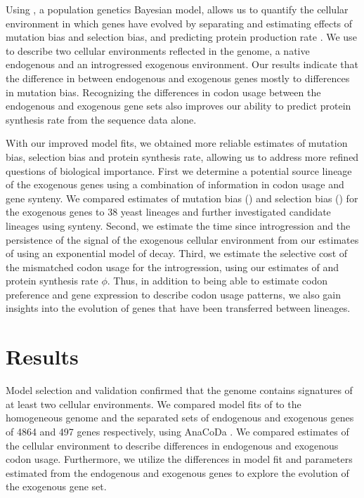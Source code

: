 Using \ROC, a population genetics Bayesian model, allows us to quantify the cellular environment in which genes have evolved by separating and estimating effects of mutation bias and selection bias, and predicting protein production rate \citep{gilchrist2015}.
We use \ROC to describe two cellular environments reflected in the \kluyveri genome, a native endogenous and an introgressed exogenous environment.
Our results indicate that the difference in \GC between endogenous and exogenous genes mostly to differences in mutation bias.
Recognizing the differences in codon usage between the endogenous and exogenous gene sets also improves our ability to predict protein synthesis rate from the sequence data alone.

With our improved model fits, we obtained more reliable estimates of mutation bias, selection bias and protein synthesis rate, allowing us to address more refined questions of biological importance.
First we determine a potential source lineage of the exogenous genes using a combination of information in codon usage and gene synteny.
We compared estimates of mutation bias (\DM) and selection bias (\DE) for the exogenous genes to 38 yeast lineages and further investigated candidate lineages using synteny.
Second, we estimate the time since introgression and the persistence of the signal of the exogenous cellular environment from our estimates of \DM using an exponential model of decay.
Third, we estimate the selective cost of the mismatched codon usage for the introgression, using our estimates of \DE and protein synthesis rate $\phi$. 
Thus, in addition to being able to estimate codon preference and gene expression to describe codon usage patterns, we also gain insights into the evolution of genes that have been transferred between lineages.

\section{Results}
Model selection and validation confirmed that the \kluyveri genome contains signatures of at least two cellular environments.
We compared model fits of \ROC to the homogeneous \kluyveri genome and the separated sets of endogenous and exogenous genes of 4864 and 497 genes respectively, using AnaCoDa \citep{landerer2018}.
We compared estimates of the cellular environment to describe differences in endogenous and exogenous codon usage.
Furthermore, we utilize the differences in model fit and parameters estimated from the endogenous and exogenous genes to explore the evolution of the exogenous gene set.

